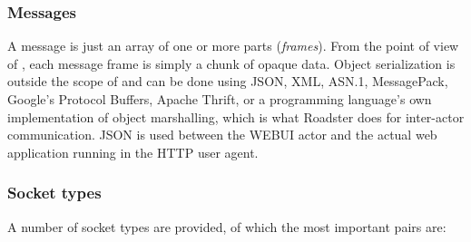 \subsubsection{Messages}
A message is just an array of one or more parts (\emph{frames}). From the point
of view of \zmq, each message frame is simply a
chunk of opaque data. Object serialization is outside the scope of \zmq and can be done using
JSON, XML, ASN.1, MessagePack, Google's Protocol Buffers, Apache Thrift, or a
programming language's own implementation of object marshalling, which is what
Roadster does for inter-actor communication. JSON is used between the WEBUI
actor and the actual web application running in the HTTP user agent.

\subsubsection{Socket types}
A number of socket types are provided, of which the most important pairs are:

